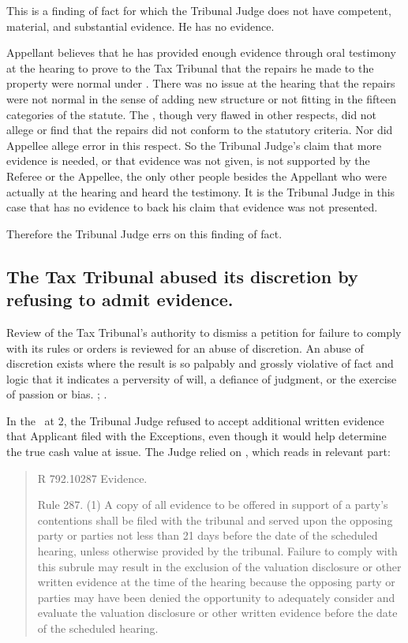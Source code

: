 \documentclass[12pt,\documentclassflag]{michiganCourtOfAppealsBrief}
\def\mathieuGast{\pincite[l]{MCL}{211.27(2)}}
\def\ttr287{\pincite[s]{TTR}{287}}
\begin{document}
{This is a finding of fact for which the Tribunal Judge does not have competent, material, and substantial evidence. He has no evidence.

Appellant believes that he has provided enough evidence through oral testimony at the hearing to prove to the Tax Tribunal that the repairs he made to the property were normal under \mathieuGast. There was no issue at the hearing that the repairs were not normal in the sense of adding new structure or not fitting in the fifteen categories of the statute. The \POJ, though very flawed in other respects, did not allege or find that the repairs did not conform to the statutory criteria. Nor did Appellee allege error in this respect. So the Tribunal Judge's claim that more evidence is needed, or that evidence was not given, is not supported by the Referee or the Appellee, the only other people besides the Appellant who were actually at the hearing and heard the testimony. It is the Tribunal Judge in this case that has no evidence to back his claim that evidence was not presented.

Therefore the Tribunal Judge errs on this finding of fact.

\subsection{The Tax Tribunal abused its discretion by refusing to admit evidence.}
Review of the Tax Tribunal's authority to dismiss a petition for failure to comply with its rules or orders is reviewed for an abuse of discretion.  An abuse of discretion exists where the result is so palpably and grossly violative of fact and logic that it indicates a perversity of will, a defiance of judgment, or the exercise of passion or bias. ; .

In the \FOJ\ at 2, the Tribunal Judge refused to accept additional written evidence that Applicant filed with the Exceptions, even though it would help determine the true cash value at issue. The Judge relied on \ttr287, which reads in relevant part: 

\begin{quote}
  R 792.10287 Evidence. 
  
  Rule 287. (1) A copy of all evidence to be offered in support of a party's contentions shall be filed with the tribunal and served upon the opposing party or parties not less than 21 days before the date of the scheduled hearing, unless otherwise provided by the tribunal. Failure to comply with this subrule may result in the exclusion of the valuation disclosure or other written evidence at the time of the hearing because the opposing party or parties may have been denied the opportunity to adequately consider and evaluate the valuation disclosure or other written evidence before the date of the scheduled hearing. 
\end{quote}

}
\end{document}
